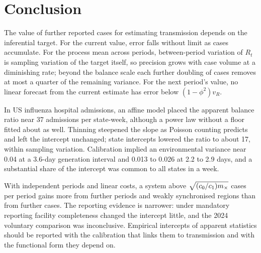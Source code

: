 \section{Conclusion}
\label{sec:conclusion}

The value of further reported cases for estimating transmission depends on the inferential target. For the current value, error falls without limit as cases accumulate. For the process mean across periods, between-period variation of $R_t$ is sampling variation of the target itself, so precision grows with case volume at a diminishing rate; beyond the balance scale each further doubling of cases removes at most a quarter of the remaining variance. For the next period's value, no linear forecast from the current estimate has error below $(1-\phi^2)v_R$.

In US influenza hospital admissions, an affine model placed the apparent balance ratio near 37 admissions per state-week, although a power law without a floor fitted about as well. Thinning steepened the slope as Poisson counting predicts and left the intercept unchanged; state intercepts lowered the ratio to about 17, within sampling variation. Calibration implied an environmental variance near 0.04 at a 3.6-day generation interval and 0.013 to 0.026 at 2.2 to 2.9 days, and a substantial share of the intercept was common to all states in a week.

With independent periods and linear costs, a system above $\sqrt{(c_0/c_1)m_{\times}}$ cases per period gains more from further periods and weakly synchronised regions than from further cases. The reporting evidence is narrower: under mandatory reporting facility completeness changed the intercept little, and the 2024 voluntary comparison was inconclusive. Empirical intercepts of apparent statistics should be reported with the calibration that links them to transmission and with the functional form they depend on.
